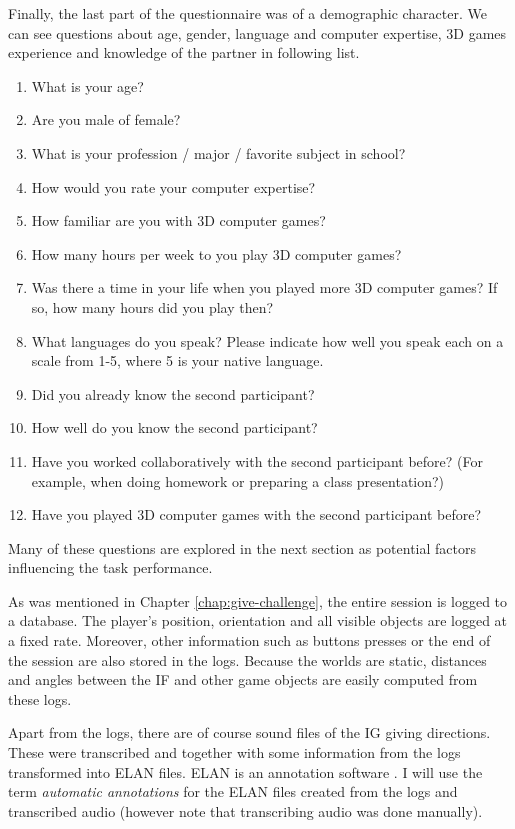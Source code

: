 Finally, the last part of the questionnaire was of a demographic character. We can see questions about age, gender, language and computer expertise, 3D games experience and knowledge of the partner in following list.

\begin{enumerate}
\item
What is your age?
\item
Are you male of female?
\item
What is your profession / major / favorite subject in school?
\item
How would you rate your computer expertise?
\item
How familiar are you with 3D computer games?
\item
How many hours per week to you play 3D computer games?
\item
Was there a time in your life when you played more 3D computer games? If so, how many hours did you play then?
\item
What languages do you speak? Please indicate how well you speak each on a scale from 1-5, where 5 is your native language.
\item
Did you already know the second participant?
\item
How well do you know the second participant?
\item
Have you worked collaboratively with the second participant before? (For example, when doing homework or preparing a class presentation?)
\item
Have you played 3D computer games with the second participant before?
\end{enumerate}

Many of these questions are explored in the next section as  potential factors influencing the task performance. 

As was mentioned in Chapter \ref{chap:give-challenge}, the entire session is logged to a database. The player's position, orientation and all visible objects are logged at a fixed rate. Moreover, other information such as buttons presses or the end of the session are also stored in the logs. Because the worlds are static, distances and angles between the IF and other game objects are easily computed from these logs.

Apart from the logs, there are of course sound files of the IG giving directions. These were transcribed and together with some information from the logs transformed into ELAN files. ELAN is an annotation software \citep{sloetjes2008annotation}. I will use the term \textit{automatic annotations} for the ELAN files created from the logs and transcribed audio (however note that transcribing audio was done manually). 

